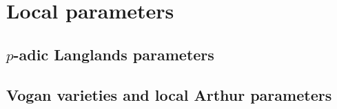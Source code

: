             \minitoc
    
    \part{Local parameters}
        \chapter{\texorpdfstring{$p$}{}-adic Langlands parameters}
            \begin{abstract}
                
            \end{abstract}
            
            \minitoc
        
            
            
            
            
        \chapter{Vogan varieties and local Arthur parameters}
            \begin{abstract}
                
            \end{abstract}
    
            \minitoc
	
	\printbibliography

